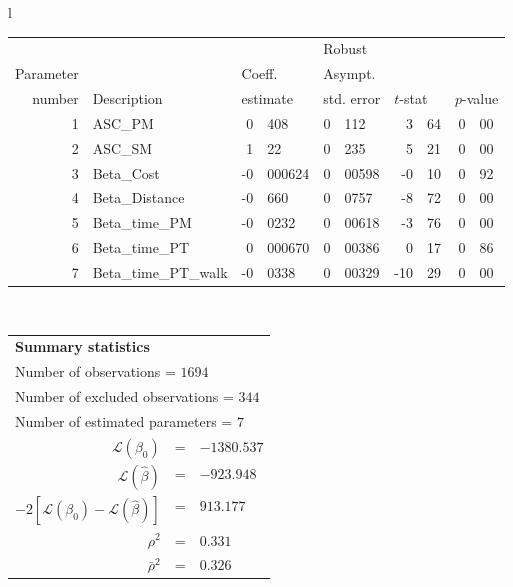   \begin{tabular}{l}
\begin{tabular}{rlr@{.}lr@{.}lr@{.}lr@{.}l}
         &                       &   \multicolumn{2}{l}{}    & \multicolumn{2}{l}{Robust}  &     \multicolumn{4}{l}{}   \\
Parameter &                       &   \multicolumn{2}{l}{Coeff.}      & \multicolumn{2}{l}{Asympt.}  &     \multicolumn{4}{l}{}   \\
number &  Description                     &   \multicolumn{2}{l}{estimate}      & \multicolumn{2}{l}{std. error}  &   \multicolumn{2}{l}{$t$-stat}  &   \multicolumn{2}{l}{$p$-value}   \\

\hline

1 & ASC_PM  & 0&408 & 0&112 & 3&64 & 0&00\\
2 & ASC_SM & 1&22 & 0&235 & 5&21 & 0&00\\
3 & Beta_Cost & -0&000624 & 0&00598 & -0&10 & 0&92\\
4 & Beta_Distance & -0&660 & 0&0757 & -8&72 & 0&00\\
5 & Beta_time_PM & -0&0232 & 0&00618 & -3&76 & 0&00\\
6 & Beta_time_PT & 0&000670 & 0&00386 & 0&17 & 0&86\\
7 & Beta_time_PT_walk & -0&0338 & 0&00329 & -10&29 & 0&00\\
\hline
\end{tabular}
\\
\begin{tabular}{rcl}
\multicolumn{3}{l}{\bf Summary statistics}\\
\multicolumn{3}{l}{ Number of observations = $1694$} \\
\multicolumn{3}{l}{ Number of excluded observations = $344$} \\
\multicolumn{3}{l}{ Number of estimated  parameters = $7$} \\
 $\mathcal{L}(\beta_0)$ &=&  $-1380.537$ \\
 $\mathcal{L}(\hat{\beta})$ &=& $-923.948 $  \\
 $-2[\mathcal{L}(\beta_0) -\mathcal{L}(\hat{\beta})]$ &=& $913.177$ \\
    $\rho^2$ &=&   $0.331$ \\
    $\bar{\rho}^2$ &=&    $0.326$ \\
\end{tabular}
  \end{tabular}
